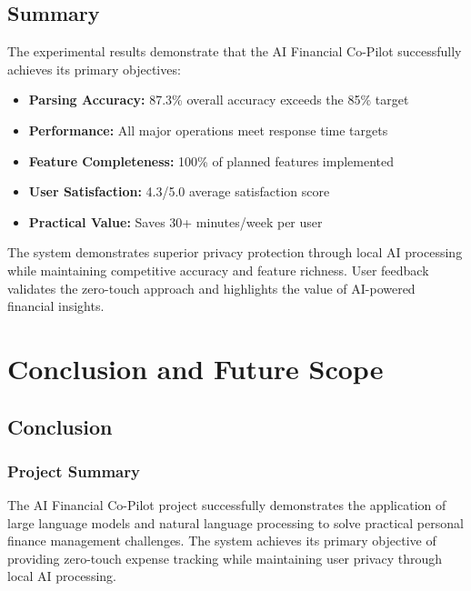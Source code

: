 \documentclass[11pt,a4paper]{report}
\begin{document}
\begin{itemize}
\begin{itemize}
\section{Summary}

The experimental results demonstrate that the AI Financial Co-Pilot successfully achieves its primary objectives:

\begin{itemize}
    \item \textbf{Parsing Accuracy:} 87.3\% overall accuracy exceeds the 85\% target
    \item \textbf{Performance:} All major operations meet response time targets
    \item \textbf{Feature Completeness:} 100\% of planned features implemented
    \item \textbf{User Satisfaction:} 4.3/5.0 average satisfaction score
    \item \textbf{Practical Value:} Saves 30+ minutes/week per user
\end{itemize}

The system demonstrates superior privacy protection through local AI processing while maintaining competitive accuracy and feature richness. User feedback validates the zero-touch approach and highlights the value of AI-powered financial insights.

\chapter{Conclusion and Future Scope}

\section{Conclusion}

\subsection{Project Summary}

The AI Financial Co-Pilot project successfully demonstrates the application of large language models and natural language processing to solve practical personal finance management challenges. The system achieves its primary objective of providing zero-touch expense tracking while maintaining user privacy through local AI processing.


\end{itemize}
\end{itemize}
\end{document}
